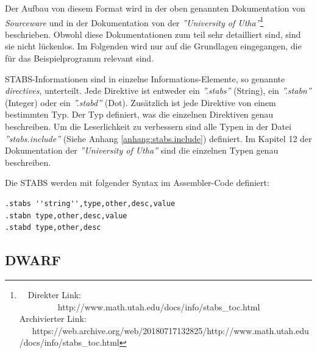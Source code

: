 Der Aufbau von diesem Format wird in der oben genannten Dokumentation von \textit{Sourceware} und in der Dokumentation von der \textit{''University of Utha''}\footnote{\ \ Direkter Link: \ \ \ \ \ \ \ \ \ http://www.math.utah.edu/docs/info/stabs\_toc.html\\ Archivierter Link: \ \ \ https://web.archive.org/web/20180717132825/http://www.math.utah.edu/docs/info/stabs\_toc.html} beschrieben.
Obwohl diese Dokumentationen zum teil sehr detailliert sind, sind sie nicht lückenlos.
Im Folgenden wird nur auf die Grundlagen eingegangen, die für das Beispielprogramm relevant sind.

STABS-Informationen sind in einzelne Informations-Elemente, so genannte \textit{directives}, unterteilt.
Jede Direktive ist entweder ein \textit{''.stabs''} (String), ein \textit{''.stabn''} (Integer) oder ein \textit{''.stabd''} (Dot).
Zusätzlich ist jede Direktive von einem bestimmten Typ.
Der Typ definiert, was die einzelnen Direktiven genau beschreiben.
Um die Leserlichkeit zu verbessern sind alle Typen in der Datei \textit{''stabs.include''} (Siehe Anhang \ref{anhang:stabs.include}) definiert.
Im Kapitel 12 der Dokumentation der \textit{''University of Utha''} sind die einzelnen Typen genau beschreiben.

Die STABS werden mit folgender Syntax im Assembler-Code definiert:\\
\lstset{language=plain}
\begin{lstlisting}
.stabs ''string'',type,other,desc,value
.stabn type,other,desc,value
.stabd type,other,desc
\end{lstlisting}



\subsection{DWARF}


